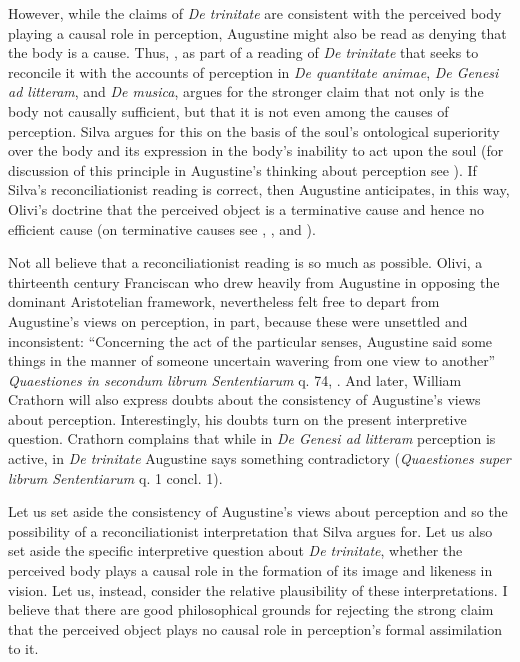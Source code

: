 \documentclass[12pt]{article}
\begin{document}
However, while the claims of \emph{De trinitate} are consistent with the perceived body playing a causal role in perception, Augustine might also be read as denying that the body is a cause. Thus, \citealt{Silva:2014bh}, as part of a reading of \emph{De trinitate} that seeks to reconcile it with the accounts of perception in \emph{De quantitate animae}, \emph{De Genesi ad litteram}, and \emph{De musica}, argues for the stronger claim that not only is the body not causally sufficient, but that it is not even among the causes of perception. Silva argues for this on the basis of the soul's ontological superiority over the body and its expression in the body's inability to act upon the soul (for discussion of this principle in Augustine's thinking about perception see \citealt{Brittain:2002hl}). If Silva's \citeyearpar{Silva:2014bh} reconciliationist reading is correct, then Augustine anticipates, in this way, Olivi's doctrine that the perceived object is a terminative cause and hence no efficient cause (on terminative causes see \citealt[192--195]{Kent:1984zm}, \citealt[chapter 5.2]{Pasnau:1997aa}, and \citealt[chapter 6]{Toivanen:2013ul}).

Not all believe that a reconciliationist reading is so much as possible. Olivi, a thirteenth century Franciscan who drew heavily from Augustine in opposing the dominant Aristotelian framework, nevertheless felt free to depart from Augustine's views on perception, in part, because these were unsettled and inconsistent: ``Concerning the act of the particular senses, Augustine said some things in the manner of someone uncertain wavering from one view to another'' \emph{Quaestiones in secondum librum Sententiarum} q. 74, \citealt[131]{Pasnau:1997aa}. And later, William Crathorn will also express doubts about the consistency of Augustine's views about perception. Interestingly, his doubts turn on the present interpretive question. Crathorn complains that while in \emph{De Genesi ad litteram} perception is active, in \emph{De trinitate} Augustine says something contradictory (\emph{Quaestiones super librum Sententiarum} q. 1 concl. 1).

Let us set aside the consistency of Augustine's views about perception and so the possibility of a reconciliationist interpretation that Silva argues for. Let us also set aside the specific interpretive question about \emph{De trinitate}, whether the perceived body plays a causal role in the formation of its image and likeness in vision. Let us, instead, consider the relative plausibility of these interpretations.  I believe that there are good philosophical grounds for rejecting the strong claim that the perceived object plays no causal role in perception's formal assimilation to it.
\end{document}
